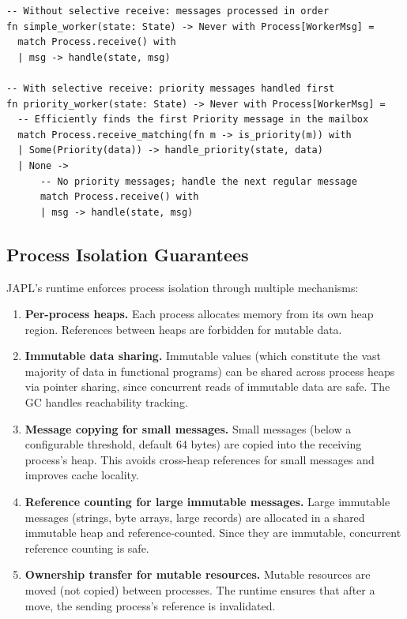 \documentclass[11pt,a4paper]{article}
\begin{document}
\begin{lstlisting}[language=japl,caption={Selective receive with efficient tag-based lookup}]
-- Without selective receive: messages processed in order
fn simple_worker(state: State) -> Never with Process[WorkerMsg] =
  match Process.receive() with
  | msg -> handle(state, msg)

-- With selective receive: priority messages handled first
fn priority_worker(state: State) -> Never with Process[WorkerMsg] =
  -- Efficiently finds the first Priority message in the mailbox
  match Process.receive_matching(fn m -> is_priority(m)) with
  | Some(Priority(data)) -> handle_priority(state, data)
  | None ->
      -- No priority messages; handle the next regular message
      match Process.receive() with
      | msg -> handle(state, msg)
\end{lstlisting}

\subsection{Process Isolation Guarantees}

JAPL's runtime enforces process isolation through multiple mechanisms:

\begin{enumerate}
\item \textbf{Per-process heaps.} Each process allocates memory from its own heap region. References between heaps are forbidden for mutable data.

\item \textbf{Immutable data sharing.} Immutable values (which constitute the vast majority of data in functional programs) can be shared across process heaps via pointer sharing, since concurrent reads of immutable data are safe. The GC handles reachability tracking.

\item \textbf{Message copying for small messages.} Small messages (below a configurable threshold, default 64 bytes) are copied into the receiving process's heap. This avoids cross-heap references for small messages and improves cache locality.

\item \textbf{Reference counting for large immutable messages.} Large immutable messages (strings, byte arrays, large records) are allocated in a shared immutable heap and reference-counted. Since they are immutable, concurrent reference counting is safe.

\item \textbf{Ownership transfer for mutable resources.} Mutable resources are moved (not copied) between processes. The runtime ensures that after a move, the sending process's reference is invalidated.
\end{enumerate}
\end{document}
